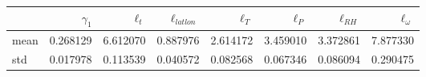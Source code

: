 \begin{tabular}{lrrrrrrr}
\toprule
{} &  $\gamma_1$ &  $\ell_t$ &  $\ell_{latlon}$ &  $\ell_T$ &  $\ell_P$ &  $\ell_{RH}$ &  $\ell_\omega$ \\
\midrule
mean &    0.268129 &  6.612070 &         0.887976 &  2.614172 &  3.459010 &     3.372861 &       7.877330 \\
std  &    0.017978 &  0.113539 &         0.040572 &  0.082568 &  0.067346 &     0.086094 &       0.290475 \\
\bottomrule
\end{tabular}
